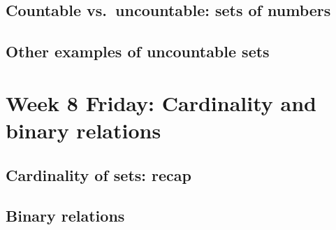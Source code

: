 \subsection*{Countable vs.\ uncountable: sets of numbers}

\subsection*{Other examples of uncountable sets}


\newpage
\section*{Week 8 Friday: Cardinality and binary relations}

\subsection*{Cardinality of sets: recap}

\newpage

\newpage

\newpage
\subsection*{Binary relations}

\vfill

\vfill
\newpage


